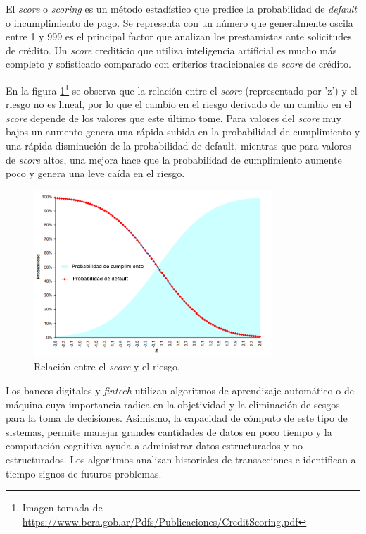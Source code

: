 El \textit{score} o \textit{scoring} es un método estadístico que predice la probabilidad de \textit{default} o incumplimiento de pago. Se representa con un número que generalmente oscila entre 1 y 999 es el principal factor que analizan los prestamistas ante solicitudes de crédito. Un \textit{score} crediticio que utiliza inteligencia artificial es mucho más completo y sofisticado comparado con criterios tradicionales de \textit{score} de crédito.

En la figura \ref{fig:Figura3}\footnote{Imagen tomada de \url{https://www.bcra.gob.ar/Pdfs/Publicaciones/CreditScoring.pdf}} se observa que  la relación entre el \textit{score} (representado por 'z') y el riesgo no es lineal, por lo que el cambio en el riesgo derivado de un cambio en el \textit{score} depende de los valores que este último tome. Para valores del \textit{score} muy bajos un aumento genera una rápida subida en la probabilidad de cumplimiento y una rápida disminución de la probabilidad de default, mientras que para valores de \textit{score} altos, una mejora hace que la probabilidad de cumplimiento aumente poco y genera una leve caída en el riesgo.

\vspace{1cm}
\begin{figure}[htbp]
	\centering
	\includegraphics[width=0.8\textwidth]{./Figures/Figura3.png}
	\caption{Relación entre el \textit{score} y el riesgo. 						}
	\label{fig:Figura3}
\end{figure}
\vspace{1cm}

\vspace{1cm}


Los bancos digitales y \textit{fintech} utilizan algoritmos de aprendizaje automático o de máquina cuya importancia radica en la objetividad y la eliminación de sesgos para la toma de decisiones. Asimismo, la capacidad de cómputo de este tipo de sistemas, permite manejar grandes cantidades de datos en poco tiempo y la computación cognitiva ayuda a administrar datos estructurados y no estructurados. Los algoritmos analizan historiales de transacciones e identifican a tiempo signos de futuros problemas.

